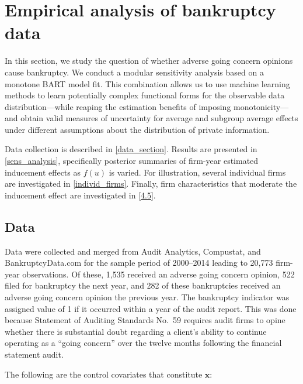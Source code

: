 \documentclass[aoas,preprint, 11pt, dvipsnames, table, x11name]{imsart}
\renewcommand{\bm}[1]{\mathbf{#1}}
\theoremstyle{remark}
\begin{document}
	\section{Empirical analysis of bankruptcy data}\label{empirical_section}
	
	In this section, we study the question of whether adverse going concern opinions cause bankruptcy. We conduct a modular sensitivity analysis based on a monotone BART model fit. This combination allows us to use machine learning methods to learn potentially complex functional forms for the observable data distribution---while reaping the estimation benefits of imposing monotonicity---and obtain valid measures of uncertainty for average and subgroup average effects under different assumptions about the distribution of private information.
	
	Data collection is described in  \autoref{data_section}.  Results are presented in \autoref{sens_analysis}, specifically posterior summaries of firm-year estimated inducement effects as $f(u)$ is varied.  For illustration, several individual firms are investigated in  \autoref{individ_firms}.  Finally, firm characteristics that moderate the inducement effect are investigated in  \autoref{4.5}.
	\subsection{Data}\label{data_section} Data were collected and merged from Audit Analytics, Compustat, and BankruptcyData.com for the sample period of 2000--2014 leading to 20,773 firm-year observations. Of these, 1,535 received an adverse going concern opinion, 522 filed for bankruptcy the next year, and 282 of these bankruptcies received an adverse going concern opinion the previous year.  The bankruptcy indicator was assigned value of 1 if it occurred within a year of the audit report.  This was done because Statement of Auditing Standards No.~59 requires audit firms to opine whether there is substantial doubt regarding a client's ability to continue operating as a ``going concern'' over the twelve months following the financial statement audit.
	
	The following are the control covariates that constitute $\bm{x}$:
	
\end{document}
